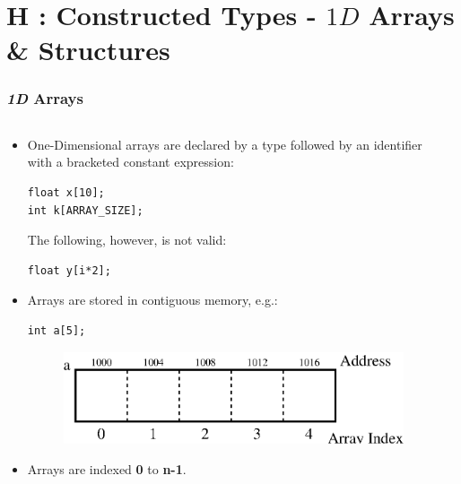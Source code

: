 \section{H : Constructed Types - $1D$ Arrays \& Structures }
\label{chap:contypes}

\begin{frame}[fragile]
\frametitle{{\em 1D} Arrays}

\begin{columns}

\begin{column}{0.55\textwidth}
\begin{itemize}
\item One-Dimensional arrays are declared by a type
followed by an identifier with a bracketed constant expression:
{\small
\begin{verbatim}
float x[10];
int k[ARRAY_SIZE];
\end{verbatim}
}
The following, however, is not valid:
{\small
\begin{verbatim}
float y[i*2];
\end{verbatim}
}
\item Arrays are stored in contiguous memory, e.g.:
{\small
\begin{verbatim}
int a[5];
\end{verbatim}
}
\begin{center}
\begin{figure}[h]
\centerline{
\includegraphics[scale=0.40]{../Figs/array9_1.eps}
}
\end{figure}
\end{center}
\item Arrays are indexed {\bf 0} to {\bf n-1}.
\end{itemize}

\end{column}

\pause
\begin{column}{0.35\textwidth}

\end{column}

\end{columns}
\end{frame}

